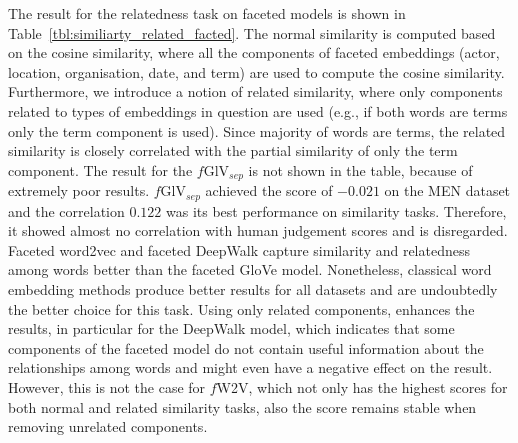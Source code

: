 The result for the relatedness task on faceted models is shown in Table~\ref{tbl:similiarty_related_facted}. The normal similarity is computed based on the cosine similarity, where all the components of faceted embeddings (actor, location, organisation, date, and term) are used to compute the cosine similarity. Furthermore, we introduce a notion of related similarity, where only components related to types of  embeddings in question are used (e.g., if both words are terms only the term component is used). Since majority of words are terms, the related similarity is closely correlated with the partial similarity of only the term component. The result for the $f$GlV$_{sep}$ is not shown in the table, because of extremely poor results.  $f$GlV$_{sep}$ achieved the score of $-0.021$ on the MEN dataset and the correlation $0.122$ was its best performance on similarity tasks. Therefore, it showed almost no correlation with human judgement scores and is disregarded. Faceted word2vec and faceted DeepWalk capture similarity and relatedness among words better than the faceted GloVe model. Nonetheless, classical word embedding methods produce better results for all datasets and are undoubtedly the better choice for this task. Using only related components, enhances the results, in particular for the DeepWalk model, which indicates that some components of the faceted model do not contain useful information about the relationships among words and might even have a negative effect on the result. However, this is not the case for $f$W2V, which not only has the highest scores for both normal and related similarity tasks, also the score remains stable when removing unrelated components. \\
